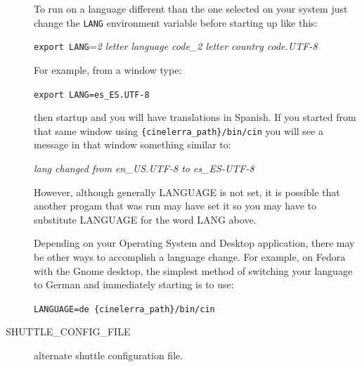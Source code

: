\begin{description}
To run on a language different than the one selected on your system just change 
the \texttt{LANG} environment variable before starting up \CGG{} like this:

\hspace{2em} \texttt{export LANG}=\textit{2 letter language code\_2 letter country code.UTF-8} 

For example, from a window type:

\hspace{2em} \texttt{export LANG=es\_ES.UTF-8} 

then startup \CGG{} and you will have translations in Spanish.  If you started \CGG{} from that same
window using \texttt{\{cinelerra\_path\}/bin/cin} you will see a message in that window something similar to:

\hspace{2em}  \textit{lang changed from en\_US.UTF-8 to es\_ES-UTF-8}

However, although generally LANGUAGE is not set, it is possible that another progam that was run may
have set it so you may have to substitute LANGUAGE for the word LANG above.

Depending on your Operating System and Desktop application, there may be other ways to accomplish a
language change.  For example, on Fedora with the Gnome desktop, the simplest method of switching your
language to German and immediately starting \CGG{} is to use:

\hspace{2em} \texttt{LANGUAGE=de \{cinelerra\_path\}/bin/cin} 


    \item[{\small SHUTTLE\_CONFIG\_FILE}] alternate shuttle configuration file.
\end{description}


